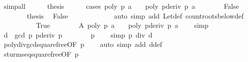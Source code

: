 \begin{isabellebody}
\ simp{\isacharunderscore}all\isanewline
\ \ \ \ \isamarkupfalse%
\ {\isacharquery}thesis\isanewline
\ \ \ \ \isamarkupfalse%
\ {\isacharparenleft}cases\ {\isachardoublequoteopen}{\isacharparenleft}poly\ p\ a\ {\isasymnoteq}\ {}\ {\isasymor}\ poly\ {\isacharparenleft}pderiv\ p{\isacharparenright}\ a\ {\isasymnoteq}\ {}{\isacharparenright}{\isachardoublequoteclose}{\isacharparenright}\isanewline
\ \ \ \ \isamarkupfalse%
\ False\isanewline
\ \ \ \ \ \ \isamarkupfalse%
\ {\isacharquery}thesis\ \isamarkupfalse%
\ False{}\ \isanewline
\ \ \ \ \ \ \ \ \ \ \isamarkupfalse%
\ {\isacharparenleft}auto\ simp\ add{\isacharcolon}\ Let{\isacharunderscore}def\ count{\isacharunderscore}roots{\isacharunderscore}below{\isacharunderscore}def{\isacharparenright}\isanewline
\ \ \ \ \isamarkupfalse%
\isanewline
\ \ \ \ \isamarkupfalse%
\ True\isanewline
\ \ \ \ \ \ \isamarkupfalse%
\ A{\isacharcolon}\ {\isachardoublequoteopen}poly\ p\ a\ {\isasymnoteq}\ {}\ {\isasymor}\ poly\ {\isacharparenleft}pderiv\ p{\isacharparenright}\ a\ {\isasymnoteq}\ {}{\isachardoublequoteclose}\ \isamarkupfalse%
\ simp\isanewline
\ \ \ \ \ \ \isamarkupfalse%
\ d\ {\isasymequiv}\ {\isachardoublequoteopen}gcd\ p\ {\isacharparenleft}pderiv\ p{\isacharparenright}{\isachardoublequoteclose}\isanewline
\ \ \ \ \ \ \isamarkupfalse%
\ {\isacharbackquoteopen}p\ {\isasymnoteq}\ {}{\isacharbackquoteclose}\ \isamarkupfalse%
\ {\isacharbrackleft}simp{\isacharbrackright}{\isacharcolon}\ {\isachardoublequoteopen}p\ div\ d\ {\isasymnoteq}\ {}{\isachardoublequoteclose}\ \isanewline
\ \ \ \ \ \ \ \ \ \ \isamarkupfalse%
\ poly{\isacharunderscore}div{\isacharunderscore}gcd{\isacharunderscore}squarefree{\isacharparenleft}{}{\isacharparenright}{\isacharbrackleft}OF\ {\isacharbackquoteopen}p\ {\isasymnoteq}\ {}{\isacharbackquoteclose}{\isacharbrackright}\ \isamarkupfalse%
\ {\isacharparenleft}auto\ simp\ add{\isacharcolon}\ d{\isacharunderscore}def{\isacharparenright}\isanewline
\ \ \ \ \ \ \isamarkupfalse%
\ sturm{\isacharunderscore}seq{\isacharunderscore}squarefree{\isacharprime}{\isacharbrackleft}OF\ {\isacharbackquoteopen}p\ {\isasymnoteq}\ {}{\isacharbackquoteclose}{\isacharbrackright}\isanewline
\ \ \ \ \ \ \ \ \ \ \isamarkupfalse%

\end{isabellebody}

